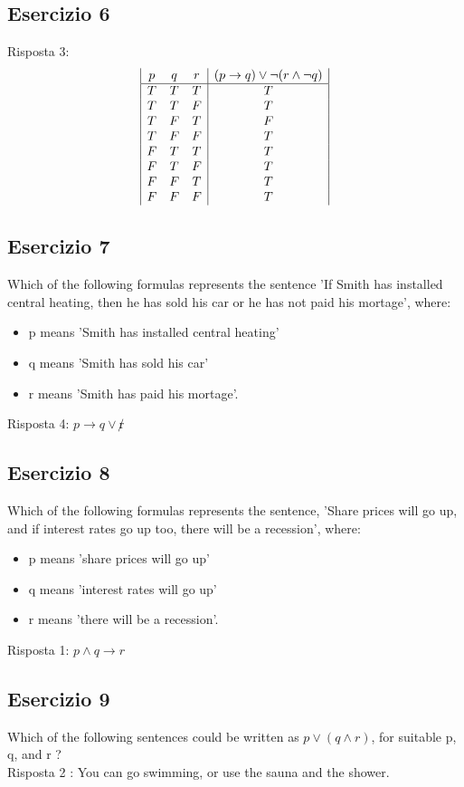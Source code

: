 \documentclass[a4paper]{article}
\begin{document}
\subsection{Esercizio 6}
Risposta 3:
\begin{displaymath}
\begin{array}{|c c c|c|}
p & q & r & (p \rightarrow q) \lor \lnot (r \land \lnot q) \\
\hline 
T & T & T & T \\
T & T & F & T \\
T & F & T & F \\
T & F & F & T \\
F & T & T & T \\
F & T & F & T \\
F & F & T & T \\
F & F & F & T \\
\end{array}
\end{displaymath}
\subsection{Esercizio 7}
Which of the following formulas represents the sentence 'If Smith has installed central heating, then he has sold his car or he has not paid his mortage', where:
\begin{itemize}
	\item p means 'Smith has installed central heating'
	\item q means 'Smith has sold his car'
	\item r means 'Smith has paid his mortage'.
\end{itemize}
Risposta 4: $ p \rightarrow q \lor \not r $
\subsection{Esercizio 8}
Which of the following formulas represents the sentence, 'Share prices will go up, and if interest rates go up too, there will be a recession', where:
\begin{itemize}
	\item p means 'share prices will go up'
	\item q means 'interest rates will go up'
	\item r means 'there will be a recession'.
\end{itemize}
Risposta 1: $p \land q \rightarrow r $
\subsection{Esercizio 9}
Which of the following sentences could be written as $ p \lor (q \land r)$, for suitable p, q, and r ?\\
Risposta 2 : You can go swimming, or use the sauna and the shower.
\end{document}
